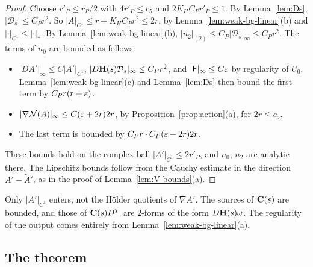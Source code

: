 \begin{proof}
Choose $r'_P\le r_P/2$ with $4r'_P\le c_5$ and $2K_HC_Pr'_P\le1$. By Lemma~\ref{lem:Ds}, $|\mathcal D_s|\le C_Pr^2$. So $|A|_{C^1}\le r+K_HC_Pr^2\le2r$, by Lemma~\ref{lem:weak-bg-linear}(b) and $|\cdot|_{C^1}\le|\cdot|_*$. By Lemma~\ref{lem:weak-bg-linear}(b), $|n_2|_{(2)}\le C_P|\mathcal D_s|_\infty\le C_Pr^2$. The terms of $n_0$ are bounded as follows:
\begin{itemize}
\item $|DA'|_\infty\le C|A'|_{C^1}$, $|D\mathbf H(s)\mathcal D_s|_\infty\le C_Pr^2$, and $|\mathsf F|_\infty\le C\varepsilon$ by regularity of $U_0$. Lemma~\ref{lem:weak-bg-linear}(c) and Lemma~\ref{lem:Ds} then bound the first term by $C_Pr(r+\varepsilon)$.
\item $|\nabla\mathcal N(A)|_\infty\le C(\varepsilon+2r)2r$, by Proposition~\ref{prop:action}(a), for $2r\le c_5$.
\item The last term is bounded by $C_Pr\cdot C_P(\varepsilon+2r)2r$.
\end{itemize}
These bounds hold on the complex ball $|A'|_{C^1}\le2r'_P$, and $n_0$, $n_2$ are analytic there. The Lipschitz bounds follow from the Cauchy estimate in the direction $A'-\tilde A'$, as in the proof of Lemma~\ref{lem:V-bounds}(a).
\end{proof}

Only $|A'|_{C^1}$ enters, not the H\"older quotients of $\nabla A'$. The sources of $\mathbf C(s)$ are bounded, and those of $\mathbf C(s)D^T$ are $2$-forms of the form $D\mathbf H(s)\omega$. The regularity of the output comes entirely from Lemma~\ref{lem:weak-bg-linear}(a).

\subsection{The theorem}\label{ss:45.4}

